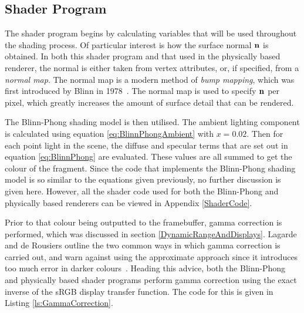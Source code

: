 \subsection{Shader Program} \label{BlinnPhongRendererShaderProgram}

The shader program begins by calculating variables that will be used throughout the shading process. Of particular interest is how the surface normal \begin{math}\mathbf{n}\end{math} is obtained. In both this shader program and that used in the physically based renderer, the normal is either taken from vertex attributes, or, if specified, from a \textit{normal map}. The normal map is a modern method of \textit{bump mapping}, which was first introduced by Blinn in 1978~\cite{BlinnBumpMapping}. The normal map is used to specify \begin{math}\mathbf{n}\end{math} per pixel, which greatly increases the amount of surface detail that can be rendered.

The Blinn-Phong shading model is then utilised. The ambient lighting component is calculated using equation \ref{eq:BlinnPhongAmbient} with \begin{math}x = 0.02\end{math}. Then for each point light in the scene, the diffuse and specular terms that are set out in equation \ref{eq:BlinnPhong} are evaluated. These values are all summed to get the colour of the fragment. Since the code that implements the Blinn-Phong shading model is so similar to the equations given previously, no further discussion is given here. However, all the shader code used for both the Blinn-Phong and physically based renderers can be viewed in Appendix \ref{ShaderCode}.

Prior to that colour being outputted to the framebuffer, gamma correction is performed, which was discussed in section \ref{DynamicRangeAndDisplays}. Lagarde and de Rousiers outline the two common ways in which gamma correction is carried out, and warn against using the approximate approach since it introduces too much error in darker colours~\cite{MovingFrostbitetoPBR}. Heading this advice, both the Blinn-Phong and physically based shader programs perform gamma correction using the exact inverse of the sRGB display transfer function. The code for this is given in Listing \ref{ls:GammaCorrection}.

